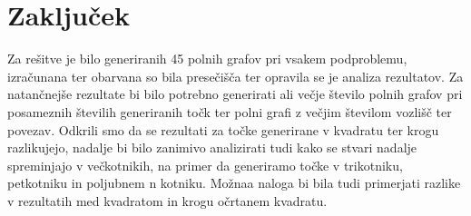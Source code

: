 \documentclass[12pt, a4paper]{article}
\begin{document}
	\section{Zaključek}
	Za rešitve je bilo generiranih 45 polnih grafov pri vsakem podproblemu, izračunana ter obarvana so bila presečišča ter opravila se je analiza rezultatov. Za natančnejše rezultate bi bilo potrebno generirati ali večje število polnih grafov pri posameznih številih generiranih točk ter polni grafi z večjim številom vozlišč ter povezav. Odkrili smo da se rezultati za točke generirane v kvadratu ter krogu razlikujejo, nadalje bi bilo zanimivo analizirati tudi kako se stvari nadalje spreminjajo v večkotnikih, na primer da generiramo točke v trikotniku, petkotniku in poljubnem n kotniku. Možnaa naloga bi bila tudi primerjati razlike v rezultatih med kvadratom in krogu očrtanem kvadratu.
\end{document}
